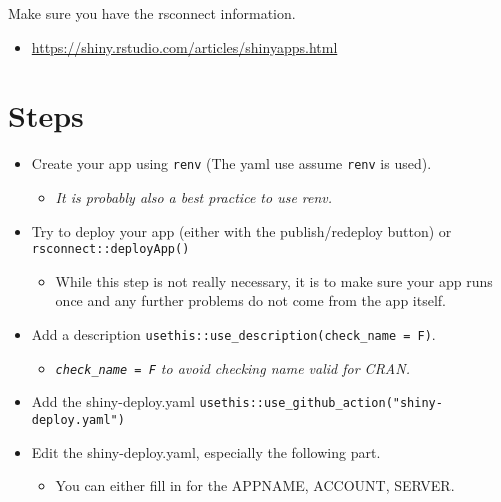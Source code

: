 \documentclass[
]{book}
\providecommand{\tightlist}{%
  \setlength{\itemsep}{0pt}\setlength{\parskip}{0pt}}
\begin{document}
Make sure you have the rsconnect information.

\begin{itemize}
\tightlist
\item
  \url{https://shiny.rstudio.com/articles/shinyapps.html}
\end{itemize}

\hypertarget{steps-1}{%
\section{Steps}\label{steps-1}}

\begin{itemize}
\item
  Create your app using \texttt{renv} (The yaml use assume \texttt{renv} is used).

  \begin{itemize}
  \tightlist
  \item
    \emph{It is probably also a best practice to use renv.}
  \end{itemize}
\item
  Try to deploy your app (either with the publish/redeploy button) or \texttt{rsconnect::deployApp()}

  \begin{itemize}
  \tightlist
  \item
    While this step is not really necessary, it is to make sure your app runs once and any further problems do not come from the app itself.
  \end{itemize}
\item
  Add a description \texttt{usethis::use\_description(check\_name\ =\ F)}.

  \begin{itemize}
  \tightlist
  \item
    \emph{\texttt{check\_name\ =\ F} to avoid checking name valid for CRAN.}
  \end{itemize}
\item
  Add the shiny-deploy.yaml \texttt{usethis::use\_github\_action("shiny-deploy.yaml")}
\item
  Edit the shiny-deploy.yaml, especially the following part.

  \begin{itemize}
  \tightlist
  \item
    You can either fill in for the APPNAME, ACCOUNT, SERVER.
  \end{itemize}


\end{itemize}
\end{document}
